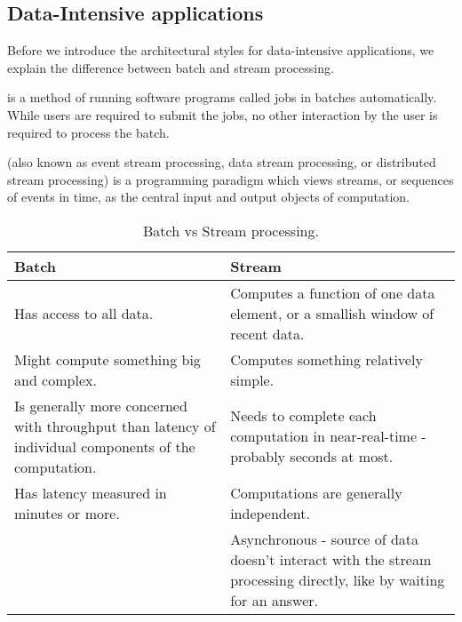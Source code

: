 \subsection{Data-Intensive applications}

Before we introduce the architectural styles for data-intensive applications, we explain the difference between batch and stream processing.

\highspace
{} is a method of running software programs called jobs in batches automatically. While users are required to submit the jobs, no other interaction by the user is required to process the batch.

\highspace
{} (also known as event stream processing, data stream processing, or distributed stream processing) is a programming paradigm which views streams, or sequences of events in time, as the central input and output objects of computation.

\begin{table}[!htp]
    \centering
    \begin{tabular}{@{} p{16em} p{16em} @{}}
        \toprule
        \textbf{Batch} & \textbf{Stream} \\
        \midrule
        Has access to all data. & Computes a function of one data element, or a smallish window of recent data. \\
        \cmidrule{1-2}
        Might compute something big and complex. & Computes something relatively simple. \\
        \cmidrule{1-2}
        Is generally more concerned with throughput than latency of individual components of the computation. & Needs to complete each computation in near-real-time - probably seconds at most. \\
        \cmidrule{1-2}
        Has latency measured in minutes or more. & Computations are generally independent. \\
        \cmidrule{1-2}
        & Asynchronous - source of data doesn't interact with the stream processing directly, like by waiting for an answer. \\
        \bottomrule
    \end{tabular}
    \caption{Batch vs Stream processing.}
\end{table}